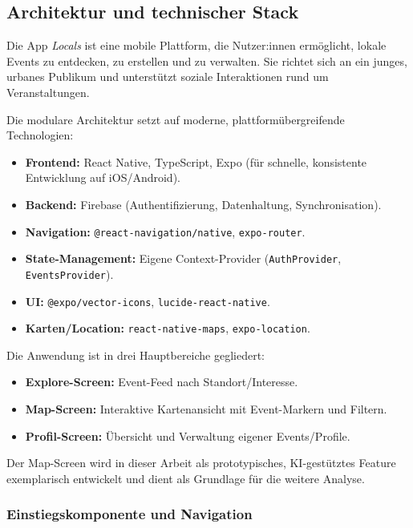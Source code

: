 
\subsection{Architektur und technischer Stack}

Die App \textit{Locals} ist eine mobile Plattform, die Nutzer:innen ermöglicht,
lokale Events zu entdecken, zu erstellen und zu verwalten. Sie richtet sich an
ein junges, urbanes Publikum und unterstützt soziale Interaktionen rund um
Veranstaltungen.

Die modulare Architektur setzt auf moderne, plattformübergreifende
Technologien:

\begin{itemize}
    \item \textbf{Frontend:} React Native, TypeScript, Expo (für schnelle, konsistente Entwicklung auf iOS/Android).
    \item \textbf{Backend:} Firebase (Authentifizierung, Datenhaltung, Synchronisation).
    \item \textbf{Navigation:} \texttt{@react-navigation/native}, \texttt{expo-router}.
    \item \textbf{State-Management:} Eigene Context-Provider (\texttt{AuthProvider}, \texttt{EventsProvider}).
    \item \textbf{UI:} \texttt{@expo/vector-icons}, \texttt{lucide-react-native}.
    \item \textbf{Karten/Location:} \texttt{react-native-maps}, \texttt{expo-location}.
\end{itemize}

Die Anwendung ist in drei Hauptbereiche gegliedert:
\begin{itemize}
    \item \textbf{Explore-Screen:} Event-Feed nach Standort/Interesse.
    \item \textbf{Map-Screen:} Interaktive Kartenansicht mit Event-Markern und Filtern.
    \item \textbf{Profil-Screen:} Übersicht und Verwaltung eigener Events/Profile.
\end{itemize}

Der Map-Screen wird in dieser Arbeit als prototypisches, KI-gestütztes Feature
exemplarisch entwickelt und dient als Grundlage für die weitere Analyse.

\subsubsection{Einstiegskomponente und Navigation}

